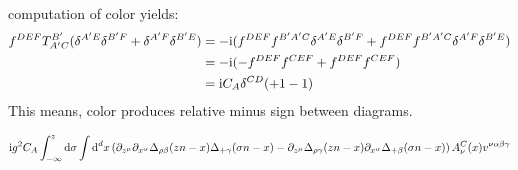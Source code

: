 computation of color yields:
\begin{align}
	f^{DEF} T^{B'}_{A'C}(\delta^{A'E} \delta^{B'F} + \delta^{A'F} \delta^{B'E})
	&=
	-\text{i}(f^{DEF}f^{B'A'C}\delta^{A'E} \delta^{B'F} + f^{DEF}f^{B'A'C}\delta^{A'F} \delta^{B'E})
	\\
	&=
	-\text{i}(-f^{DEF}f^{CEF} + f^{DEF}f^{CEF})
	\\
	&=
	\text{i} C_A\delta^{CD}(+1 -1)
\end{align}
This means, color produces relative minus sign between diagrams.

\begin{align}
	\text{i} g^2 C_A \int_{-\infty}^z \text{d} \sigma  \int \text{d} ^d x 
	\left( \partial_{z^\mu} \partial_{x^\alpha} \Delta_{\rho \beta}(zn-x) \Delta_{+ \gamma}(\sigma n -x) - \partial_{z^\mu}  \Delta_{\rho \gamma}(zn-x) \partial_{x^\alpha}\Delta_{+ \beta}(\sigma n -x) \right)A_{\nu}^{C}(x)v^{\nu \alpha\beta\gamma}
\end{align}

